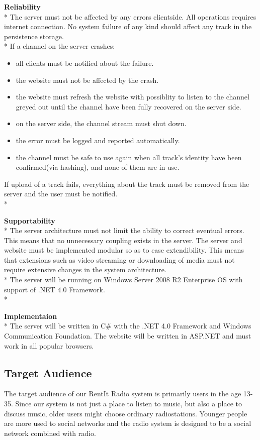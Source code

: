 \documentclass[a4paper,11pt,report]{article}
\begin{document}
\textbf{Reliability} \\*
The server must not be affected by any errors clientside. All operations requires internet connection. No system failure of any kind should affect any track in the persistence storage. \\*
If a channel on the server crashes:
\begin{itemize}
\item all clients must be notified about the failure.
\item the website must not be affected by the crash.
\item the website must refresh the website with possiblity to listen to the channel greyed out until the channel have been fully recovered on the server side.
\item on the server side, the channel stream must shut down.
\item the error must be logged and reported automatically. 
\item the channel must be safe to use again when all track's identity have been confirmed(via hashing), and none of them are in use.
\end{itemize}
If upload of a track fails, everything about the track must be removed from the server and the user must be notified. \\*

\textbf{Supportability} \\*
The server architecture must not limit the ability to correct eventual errors. This means that no unnecessary coupling exists in the server.
The server and website must be implemented modular so as to ease extendibility.
This means that extensions such as video streaming or downloading of media must not require extensive changes in the system architecture. \\*
The server will be running on Windows Server 2008 R2 Enterprise OS with support of .NET 4.0 Framework.\\*

\textbf{Implementaion} \\*
The server will be written in C\# with the .NET 4.0 Framework and Windows Communication Foundation.
The website will be written in ASP.NET and must work in all popular browsers.

\subsection{Target Audience}
The target audience of our RentIt Radio system is primarily users in the age 13-35. Since our system is not just a place to listen to music, but also a place to discuss music,  older users might choose ordinary radiostations. Younger people are more used to social networks and the radio system is designed to be a social network combined with radio.
\end{document}
